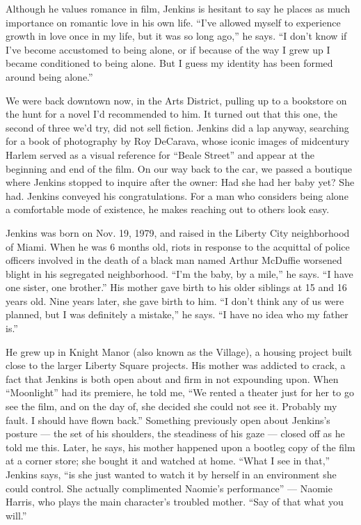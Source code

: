 Although he values romance in film, Jenkins is hesitant to say he places
as much importance on romantic love in his own life. ``I've allowed
myself to experience growth in love once in my life, but it was so long
ago,'' he says. ``I don't know if I've become accustomed to being alone,
or if because of the way I grew up I became conditioned to being alone.
But I guess my identity has been formed around being alone.''

We were back downtown now, in the Arts District, pulling up to a
bookstore on the hunt for a novel I'd recommended to him. It turned out
that this one, the second of three we'd try, did not sell fiction.
Jenkins did a lap anyway, searching for a book of photography by Roy
DeCarava, whose iconic images of midcentury Harlem served as a visual
reference for ``Beale Street'' and appear at the beginning and end of
the film. On our way back to the car, we passed a boutique where Jenkins
stopped to inquire after the owner: Had she had her baby yet? She had.
Jenkins conveyed his congratulations. For a man who considers being
alone a comfortable mode of existence, he makes reaching out to others
look easy.

Jenkins was born on Nov. 19, 1979, and raised in the Liberty City
neighborhood of Miami. When he was 6 months old, riots in response to
the acquittal of police officers involved in the death of a black man
named Arthur McDuffie worsened blight in his segregated neighborhood.
``I'm the baby, by a mile,'' he says. ``I have one sister, one
brother.'' His mother gave birth to his older siblings at 15 and 16
years old. Nine years later, she gave birth to him. ``I don't think any
of us were planned, but I was definitely a mistake,'' he says. ``I have
no idea who my father is.''

He grew up in Knight Manor (also known as the Village), a housing
project built close to the larger Liberty Square projects. His mother
was addicted to crack, a fact that Jenkins is both open about and firm
in not expounding upon. When ``Moonlight'' had its premiere, he told me,
``We rented a theater just for her to go see the film, and on the day
of, she decided she could not see it. Probably my fault. I should have
flown back.'' Something previously open about Jenkins's posture --- the
set of his shoulders, the steadiness of his gaze --- closed off as he
told me this. Later, he says, his mother happened upon a bootleg copy of
the film at a corner store; she bought it and watched at home. ``What I
see in that,'' Jenkins says, ``is she just wanted to watch it by herself
in an environment she could control. She actually complimented Naomie's
performance'' --- Naomie Harris, who plays the main character's troubled
mother. ``Say of that what you will.''

